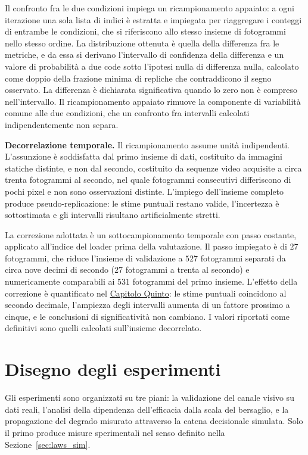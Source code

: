 \ifstampa\documentclass[a4paper,12pt,twoside,openright]{report}\else\documentclass[a4paper,12pt]{report}\fi
\newif\ifrevisione \revisionefalse
\DeclareRobustCommand{\rev}[1]{\ifrevisione{\color{blue!65!black}#1}\else#1\fi}
\begin{document}
Il confronto fra le due condizioni impiega un ricampionamento appaiato: a ogni
iterazione una sola lista di indici è estratta e impiegata per riaggregare i
conteggi di entrambe le condizioni, che si riferiscono allo stesso insieme di
fotogrammi nello stesso ordine. La distribuzione ottenuta è quella della
differenza fra le metriche, e da essa si derivano l'intervallo di confidenza
della differenza e un valore di probabilità a due code sotto l'ipotesi nulla di
differenza nulla, calcolato come doppio della frazione minima di repliche che
contraddicono il segno osservato. La differenza è dichiarata significativa
quando lo zero non è compreso nell'intervallo. Il ricampionamento appaiato
rimuove la componente di variabilità comune alle due condizioni, che un
confronto fra intervalli calcolati indipendentemente non separa.

\textbf{Decorrelazione temporale.}
\label{sec:decorrelazione}
Il ricampionamento assume unità indipendenti. L'assunzione è soddisfatta dal
primo insieme di dati, costituito da immagini statiche distinte, e non dal
secondo, costituito da sequenze video acquisite a circa trenta fotogrammi al
secondo, nel quale fotogrammi consecutivi differiscono di pochi pixel e non
sono osservazioni distinte. L'impiego dell'insieme completo produce
pseudo-replicazione: le stime puntuali restano valide, l'incertezza è
sottostimata e gli intervalli risultano artificialmente stretti.

La correzione adottata è un sottocampionamento temporale con passo costante,
applicato all'indice del loader prima della valutazione. Il passo impiegato è di
$27$ fotogrammi, che riduce l'insieme di validazione a $527$ fotogrammi separati
da circa nove decimi di secondo \rev{($27$ fotogrammi a trenta al secondo)} e numericamente comparabili ai $531$ fotogrammi
del primo insieme. L'effetto della correzione è quantificato nel \hyperref[cap5]{Capitolo Quinto}: le stime puntuali coincidono al secondo decimale,
l'ampiezza degli intervalli aumenta di un fattore prossimo a cinque, e le
conclusioni di significatività non cambiano. I valori riportati come definitivi
sono quelli calcolati sull'insieme decorrelato.

\section{Disegno degli esperimenti}
\label{sec:esperimenti}

Gli esperimenti sono organizzati su tre piani: la validazione del canale visivo
su dati reali, l'analisi della dipendenza dell'efficacia dalla scala del
bersaglio, e la propagazione del degrado misurato attraverso la catena
decisionale simulata. Solo il primo produce misure sperimentali nel senso
definito nella Sezione~\ref{sec:laws_sim}.
\end{document}
